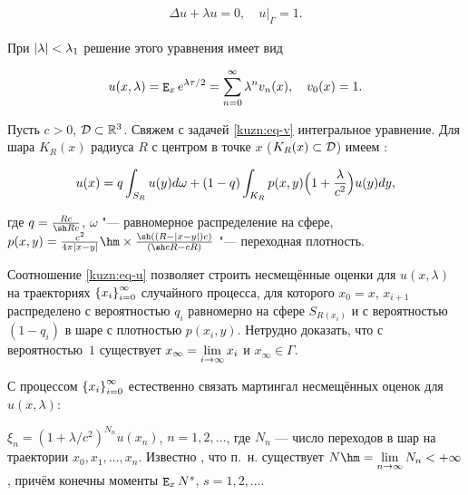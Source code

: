     \begin{gather}

        \Delta u +\lambda u =0, \quad u\bigr|_\Gamma=1.

            \label{kuzn:eq-v}

    \end{gather}

При $\left|{\lambda}\right|<\lambda_1$ решение этого уравнения имеет вид

    \[

        u(x, \lambda)=\expect_x e^{\lambda\tau/2}=\lsum_{n=0}^\infty\lambda^n v_n(x), \quad v_0(x)=1.

    \]



    Пусть $c>0$, $\mathcal{D}\subset\mathbb{R}^3$. Свяжем с задачей \eqref{kuzn:eq-v} интегральное уравнение. Для шара $K_R(x)$ радиуса $R$ с центром в точке $x$ ($K_R(x)\subset \mathcal{D}$) имеем \cite{kuzn:ENS}:

    \begin{equation}\label{kuzn:eq-u}

        u(x)=q\int_{S_R}u(y)d\omega+(1-q)\int_{K_R}p(x, y)\Bigl(1+\frac{\lambda}{c^2}\Bigr)u(y)dy,

    \end{equation}

    где $q=\frac{Rc}{\sh Rc}$, $\omega$ "--- равномерное распределение на сфере, $p(x, y)=\frac{c^2}{4\pi\abs{x-y}}\hm\times\frac{\sh((R-\abs{x-y})c)}{(\sh cR-cR)}$ "--- переходная плотность.



    Соотношение \eqref{kuzn:eq-u} позволяет строить несмещённые оценки для $u(x, \lambda)$ на траекториях $\left\{x_i\right\}_{i=0}^\infty$ случайного процесса, для которого $x_0=x$, $x_{i+1}$ распределено с вероятностью $q_i$ равномерно на сфере $S_{R(x_i)}$ и с вероятностью $(1-q_i)$ в шаре с плотностью $p(x_i, y)$. Нетрудно доказать, что с вероятностью~$1$ существует $x_\infty=\lim\limits_{i\to\infty} x_i$ и $x_\infty\in \Gamma$.



    С процессом $\left\{x_i\right\}_{i=0}^\infty$ естественно связать мартингал несмещённых оценок для $u(x, \lambda)$:

    $\xi_n=\left(1+\lambda/c^2\right)^{N_n}u(x_n)$, $n=1, 2, \ldots$, где $N_n$ --- число переходов в шар на траектории $x_0, x_1, \ldots, x_n$. Известно \cite{kuzn:ENS}, что п.~н. существует $N\hm=\llim_{n\to\infty}N_n<+\infty$, причём конечны моменты $\mathop{\tt E}\nolimits_x N^s$, $s=1, 2, \ldots$.



